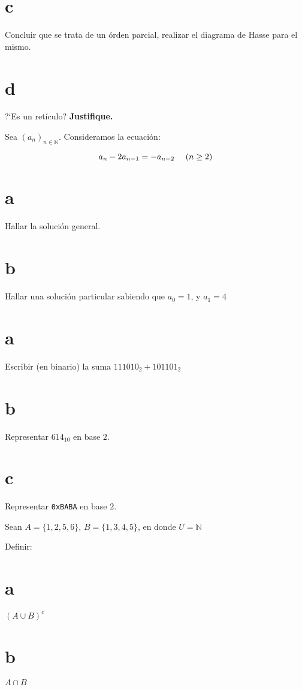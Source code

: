 \part{c}
Concluir que se trata de un \'orden parcial, realizar el diagrama de Hasse para
el mismo.
\part{d}
?`Es un ret\'iculo? {\bf Justifique.}



Sea $(a_n)_{n \in \mathbb{N}}$.
Consideramos la ecuaci\'on:

$$a_n - 2a_{n-1} = -a_{n-2} \hbox{ ~~ } (n \geq 2)$$

\part{a}
Hallar la soluci\'on general.

\part{b}
Hallar una soluci\'on particular sabiendo que $a_0 = 1$, y $ a_1 = 4$



\part{a}
Escribir (en binario) la suma $111010_2 + 101101_2$

\part{b}
Representar $614_{10}$ en base $2$.

\part{c}
Representar {\tt 0xBABA} en base $2$.



Sean $A = \{1,2,5,6\}$, $B = \{1,3,4,5\}$, en donde $U = \mathbb{N}$


Definir:

\part{a} $(A \cup B)^{c}$

\part{b} $A \cap B$

